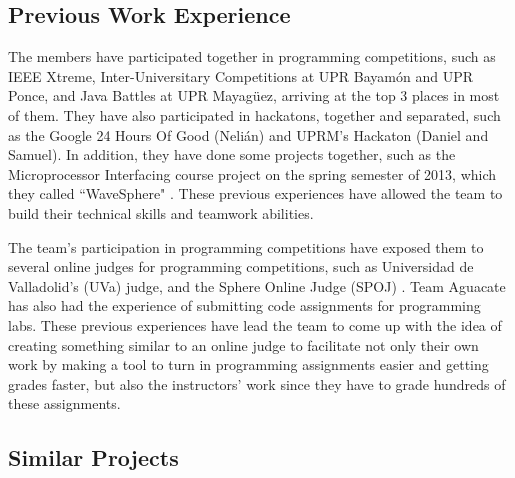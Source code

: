 
\subsection{Previous Work Experience}

The members have participated together in programming
competitions, such as IEEE Xtreme, Inter-Universitary Competitions at UPR Bayamón and UPR Ponce, and Java Battles at UPR Mayagüez, arriving at the top 3 places in most of them. They have also participated in hackatons, together and separated, such as the Google 24 Hours Of Good (Nelián) and UPRM's Hackaton (Daniel and Samuel). In addition, they have done some projects together, such as the Microprocessor Interfacing
course project on the spring semester of 2013, which they called ``WaveSphere"
\cite{Micro2}. These previous experiences have allowed the team to build their
technical skills and teamwork abilities.

The team's participation in programming competitions have exposed them to
several  online judges for programming competitions, such as Universidad de
Valladolid's (UVa) judge, \cite{UVA} and the Sphere Online Judge (SPOJ)
\cite{SPOJ}. Team Aguacate has also had the experience of submitting code
assignments for programming labs. These previous experiences have lead the team
to come up with the idea of creating something similar to an online judge to
facilitate not only their own work by making a tool to turn in programming
assignments easier and getting grades faster, but also the instructors' work
since they have to grade hundreds of these assignments.

\subsection{Similar Projects}

